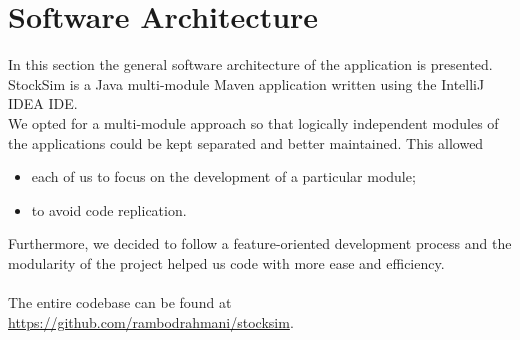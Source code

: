 \chapter{Software Architecture}
In this section the general software architecture of the application is
presented.\\
StockSim is a Java multi-module Maven application written using the IntelliJ
IDEA IDE.\\
We opted for a multi-module approach so that logically independent modules of
the applications could be kept separated and better maintained. This allowed
\begin{itemize}
    \item each of us to focus on the development of a particular module;
    \item to avoid code replication.
\end{itemize}
Furthermore, we decided to follow a feature-oriented development process and the
modularity of the project helped us code with more ease and efficiency.\\
\\
The entire codebase can be found at \url{https://github.com/rambodrahmani/stocksim}.
